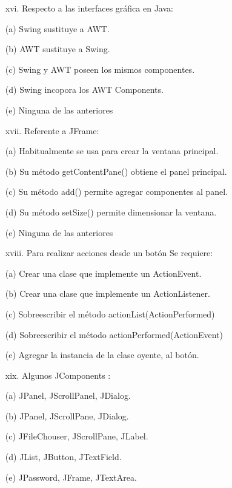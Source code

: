\documentclass[10pt]{article}
\begin{document}
{\begin{enumerate}
\begin{multicols}{2}
    \begin{enumerate}[label=(\alph*)]
        \item[xvi.] Respecto a las interfaces gr\'afica en Java:
        \item[(a)] Swing sustituye a AWT.
        \item[(b)] AWT sustituye a Swing.
        \item[(c)] Swing y AWT poseen los mismos componentes.
        \item[(d)] Swing incopora los AWT Components.
        \item[(e)] Ninguna de las anteriores
    \end{enumerate}

    \begin{enumerate}[label=(\alph*)]
        \item[xvii.] Referente a JFrame:
        \item[(a)] Habitualmente se usa para crear la ventana principal.
        \item[(b)] Su m\'etodo getContentPane() obtiene el panel principal.
        \item[(c)] Su m\'etodo add() permite agregar componentes al panel.
        \item[(d)] Su m\'etodo setSize() permite dimensionar la ventana.
        \item[(e)] Ninguna de las anteriores
    \end{enumerate}

    \begin{enumerate}[label=(\alph*)]
        \item[xviii.] Para realizar acciones desde un bot\'on Se requiere:
        \item[(a)] Crear una clase que implemente un ActionEvent.
        \item[(b)] Crear una clase que implemente un ActionListener.
        \item[(c)] Sobreescribir el m\'etodo actionList(ActionPerformed)
        \item[(d)] Sobreescribir el m\'etodo actionPerformed(ActionEvent)
        \item[(e)] Agregar la instancia de la clase oyente, al bot\'on.
    \end{enumerate}

    \begin{enumerate}[label=(\alph*)]
        \item[xix.] Algunos JComponents : 
        \item[(a)] JPanel, JScrollPanel, JDialog.
        \item[(b)] JPanel, JScrollPane, JDialog.
        \item[(c)] JFileChouser, JScrollPane, JLabel.
        \item[(d)] JList, JButton, JTextField.
        \item[(e)] JPassword, JFrame, JTextArea.
    \end{enumerate}


\end{multicols}
\end{enumerate}}
\end{document}
